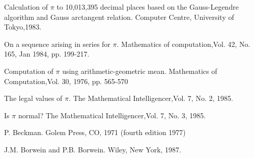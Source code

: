   {Calculation of $\pi$ to 10,013,395
  decimal places based on the Gauss-Legendre algorithm and Gauss
  arctangent relation.}  {Computer Centre, University of Tokyo,}{1983.}

  {On a sequence arising in
  series for $\pi$.}  {Mathematics of computation,}{Vol. 42, No. 165,
  Jan 1984, pp. 199-217.}

  {Computation of $\pi$ using arithmetic-geometric
  mean.}  {Mathematics of Computation,}{Vol. 30, 1976, pp. 565-570}

  {The legal values of $\pi$.}  {The
  Mathematical Intelligencer,}{Vol. 7, No. 2, 1985.}

  {Is $\pi$ normal?}  {The Mathematical
  Intelligencer,}{Vol. 7, No. 3, 1985.}

\medskip

  {P. Beckman.}  {Golem Press, CO, 1971
  (fourth edition 1977)}

  {J.M. Borwein and P.B. Borwein.}  {Wiley,
  New York, 1987.}

